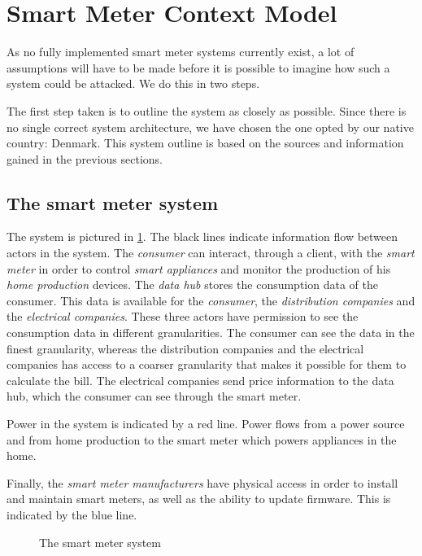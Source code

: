 \section{Smart Meter Context Model}\label{sec:smartmetercontext}
As no fully implemented smart meter systems currently exist, a lot of assumptions will have to be made before it is possible to imagine how such a system could be attacked.
We do this in two steps.

The first step taken is to outline the system as closely as possible.
Since there is no single correct system architecture, we have chosen the one opted by our native country: Denmark.
This system outline is based on the sources and information gained in the previous sections.

\subsection{The smart meter system}
The system is pictured in \cref{contextual:system}.
The black lines indicate information flow between actors in the system.
The \emph{consumer} can interact, through a client, with the \emph{smart meter} in order to control \emph{smart appliances} and monitor the production of his \emph{home production} devices.
The \emph{data hub} stores the consumption data of the consumer.
This data is available for the \emph{consumer}, the \emph{distribution companies} and the \emph{electrical companies}.
These three actors have permission to see the consumption data in different granularities.
The consumer can see the data in the finest granularity, whereas the distribution companies and the electrical companies has access to a coarser granularity that makes it possible for them to calculate the bill.
The electrical companies send price information to the data hub, which the consumer can see through the smart meter.

Power in the system is indicated by a red line.
Power flows from a power source and from home production to the smart meter which powers appliances in the home.

Finally, the \emph{smart meter manufacturers} have physical access in order to install and maintain smart meters, as well as the ability to update firmware.
This is indicated by the blue line.

\begin{figure}[h]
  \centering
  
  \caption{The smart meter system\cite{tdlm}}
  \label{contextual:system}
\end{figure}

